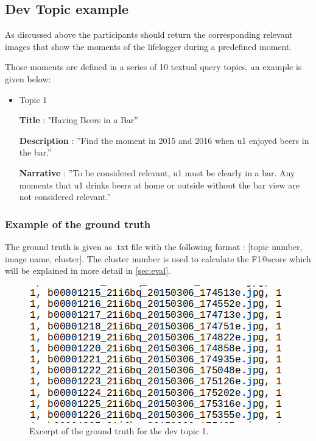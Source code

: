     \newpage
    \subsection{Dev Topic example}
    \label{sec:devtopic1}
    As discussed above the participants should return the corresponding relevant images that show the moments of the lifelogger during a predefined moment. 
    
    Those moments are defined in a series of 10 textual query topics, an example is given below:


    \begin{itemize}
        \item Topic 1 
        
        \textbf{Title} : "Having Beers in a Bar”

        \textbf{Description} : ”Find the moment in 2015 and 2016 when u1 enjoyed beers in the bar.”

        \textbf{Narrative} : ”To be considered relevant, u1 must be clearly in a bar. Any moments that u1 drinks beers at home or outside without the bar view are not considered relevant.”
        


    \end{itemize}
    

    \subsubsection{Example of the ground truth}


    The ground truth is given as .txt file with the following format : [topic number, image name, cluster].
    The cluster number is used to calculate the F1@score which will be explained in more detail in \ref{sec:eval}.


    \begin{figure}[htb]
        
        \centering
        \includegraphics[scale = 0.55]{Sections/5ImageClef/images/gt_t1.png}
        \caption{Excerpt of the ground truth for the dev topic 1.}  
        \label{fig:gt}
    \end{figure}


